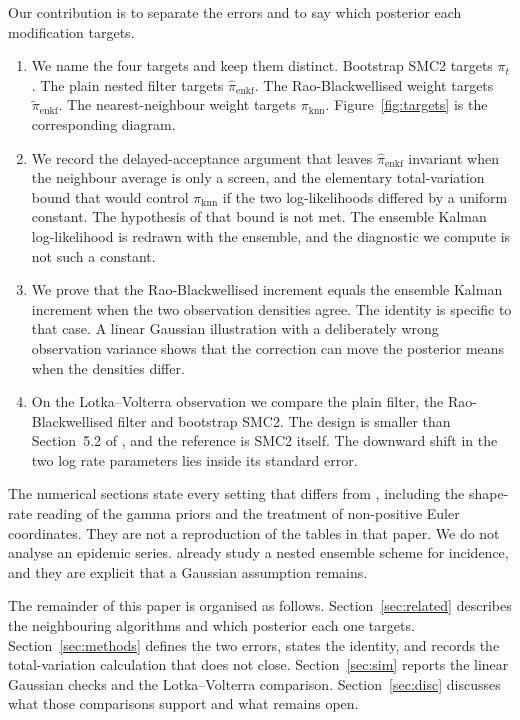 Our contribution is to separate the errors and to say which posterior each modification targets.
\begin{enumerate}
\item[(i)] We name the four targets and keep them distinct. Bootstrap SMC2 targets \(\pi_t\). The plain nested filter targets \(\hat{\pi}_{\mathrm{enkf}}\). The Rao-Blackwellised weight targets \(\tilde{\pi}_{\mathrm{enkf}}\). The nearest-neighbour weight targets \(\pi_{\mathrm{knn}}\). Figure~\ref{fig:targets} is the corresponding diagram.
\item[(ii)] We record the delayed-acceptance argument that leaves \(\hat{\pi}_{\mathrm{enkf}}\) invariant when the neighbour average is only a screen, and the elementary total-variation bound that would control \(\pi_{\mathrm{knn}}\) if the two log-likelihoods differed by a uniform constant. The hypothesis of that bound is not met. The ensemble Kalman log-likelihood is redrawn with the ensemble, and the diagnostic we compute is not such a constant.
\item[(iii)] We prove that the Rao-Blackwellised increment equals the ensemble Kalman increment when the two observation densities agree. The identity is specific to that case. A linear Gaussian illustration with a deliberately wrong observation variance shows that the correction can move the posterior means when the densities differ.
\item[(iv)] On the Lotka--Volterra observation we compare the plain filter, the Rao-Blackwellised filter and bootstrap SMC2. The design is smaller than Section~5.2 of \citet{golightly2026}, and the reference is SMC2 itself. The downward shift in the two log rate parameters lies inside its standard error.
\end{enumerate}
The numerical sections state every setting that differs from \citet{golightly2026}, including the shape-rate reading of the gamma priors and the treatment of non-positive Euler coordinates. They are not a reproduction of the tables in that paper. We do not analyse an epidemic series. \citet{temfack2026} already study a nested ensemble scheme for incidence, and they are explicit that a Gaussian assumption remains.

\FloatBarrier
The remainder of this paper is organised as follows. Section~\ref{sec:related} describes the neighbouring algorithms and which posterior each one targets. Section~\ref{sec:methods} defines the two errors, states the identity, and records the total-variation calculation that does not close. Section~\ref{sec:sim} reports the linear Gaussian checks and the Lotka--Volterra comparison. Section~\ref{sec:disc} discusses what those comparisons support and what remains open.
